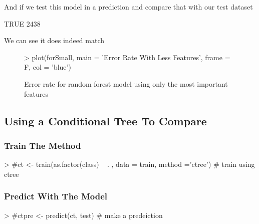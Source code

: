\documentclass[10pt]{article}         %
\begin{document}
And if we test this model in a prediction and compare that with our test dataset
\begin{Schunk}
\begin{Soutput}
TRUE 
2438 
\end{Soutput}
\end{Schunk}
We can see it does indeed match
\pagebreak
\begin{figure}[H]
\begin{center}
\begin{Schunk}
\begin{Sinput}
> plot(forSmall, main = 'Error Rate With Less Features', frame = F, col = 'blue')
\end{Sinput}
\end{Schunk}
\caption {Error rate for random forest model using only the most important features}
\label{fig6}
\end {center}
\end {figure}

\subsection{Using a Conditional Tree To Compare}
\subsubsection{Train The Method}
\begin{Schunk}
\begin{Sinput}
> #ct <- train(as.factor(class) ~ . , data = train, method ='ctree') # train using ctree
\end{Sinput}
\end{Schunk}

\subsubsection{Predict With The Model}
\begin{Schunk}
\begin{Sinput}
> #ctpre <- predict(ct, test) # make a predeiction 
\end{Sinput}
\end{Schunk}
\end{document}
